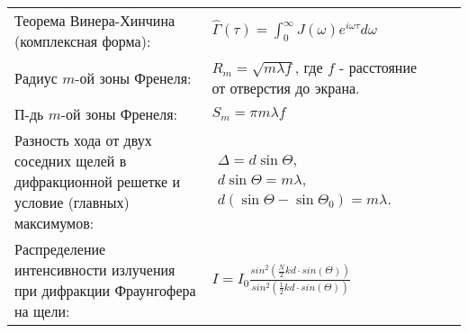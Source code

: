 \documentclass{article}
\begin{document}
\begin{tabular}{ |p{4.2cm}|p{5.3cm}|p{6cm}|p{3.5cm}|  }
                                                                             &  %
                                                                             \\ %
\hline
Теорема Винера-Хинчина (комплексная форма):                                  &  %
$\hat{\Gamma}(\tau) =
 \int_{0}^{\infty} J(\omega) e^{i \omega \tau} d\omega$                      &  %
                                                                             &  %
                                                                             \\ %
\hline
Радиус $m$-ой зоны Френеля:                                                  &  %
$R_m = \sqrt{m \lambda f}$, где $f$ - расстояние от отверстия до экрана.     &  %
                                                                             &  %
                                                                             \\ %
\hline
П-дь $m$-ой зоны Френеля:                                                    &  %
$S_m = \pi m \lambda f$                                                      &  %
                                                                             &  %
                                                                             \\ %
\hline
Разность хода от двух соседних щелей в дифракционной решетке и
 условие (главных) максимумов:                                               &  %
$\begin{aligned}
\Delta = d \sin \Theta, \\
d \sin \Theta = m \lambda, \\
d(\sin{\Theta}-\sin{\Theta_0}) = m \lambda.
\end{aligned}$                                                               &  %
                                                                             &  %
                                                                             \\ %
\hline
Распределение интенсивности излучения при дифракции Фраунгофера на щели:     &  %
$I = I_0 \frac{sin^2(\frac{N}{2} kd \cdot sin(\Theta))}
              {sin^2(\frac{1}{2} kd \cdot sin(\Theta))}$                     &  %
                                                                             &  %
                                                                             \\ %

\end{tabular}
\end{document}
